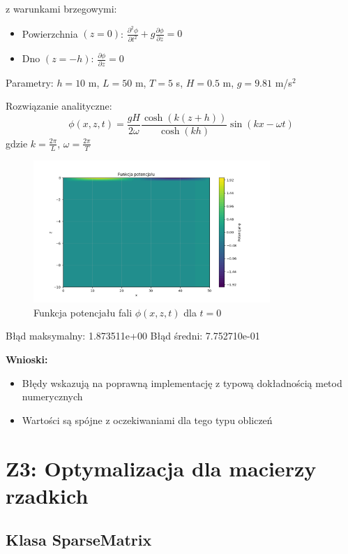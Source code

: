 \documentclass[12pt,a4paper]{article}
\begin{document}
z warunkami brzegowymi:
\begin{itemize}
    \item Powierzchnia $(z = 0)$: $\frac{\partial^2\phi}{\partial t^2} + g \frac{\partial\phi}{\partial z} = 0$
    \item Dno $(z = -h)$: $\frac{\partial\phi}{\partial z} = 0$
\end{itemize}

Parametry: $h = 10$ m, $L = 50$ m, $T = 5$ s, $H = 0.5$ m, $g = 9.81$ m/s$^2$

Rozwiązanie analityczne:
\begin{equation}
\phi(x,z,t) = \frac{gH}{2\omega}\frac{\cosh(k(z+h))}{\cosh(kh)}\sin(kx-\omega t)
\end{equation}
gdzie $k = \frac{2\pi}{L}$, $\omega = \frac{2\pi}{T}$

\begin{figure}[h]
    \centering
    \includegraphics[width=0.8\textwidth]{potentials.png}
    \caption{Funkcja potencjału fali $\phi(x,z,t)$ dla $t=0$}
\end{figure}

Błąd maksymalny: 1.873511e+00
Błąd średni: 7.752710e-01

\textbf{Wnioski:}
\begin{itemize}
\item Błędy wskazują na poprawną implementację z typową dokładnością metod numerycznych
\item Wartości są spójne z oczekiwaniami dla tego typu obliczeń
\end{itemize} 

\section{Z3: Optymalizacja dla macierzy rzadkich}

\subsection{Klasa SparseMatrix}
\end{document}
